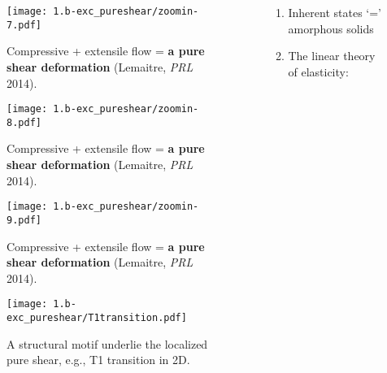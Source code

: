 \begin{frame}[c]
\begin{columns}[T]
\begin{column}[T]{0.4\textwidth}
\begin{figure}[t]
\begin{overprint}
\centering\texttt{[image: 1.b-exc\_pureshear/zoomin-7.pdf]}\caption{Compressive + extensile flow = \textbf{a pure shear deformation} {\footnotesize (Lemaitre, \textit{PRL} 2014).}}

\centering\texttt{[image: 1.b-exc\_pureshear/zoomin-8.pdf]}\caption{Compressive + extensile flow = \textbf{a pure shear deformation} {\footnotesize (Lemaitre, \textit{PRL} 2014).}}

\centering\texttt{[image: 1.b-exc\_pureshear/zoomin-9.pdf]}\caption{Compressive + extensile flow = \textbf{a pure shear deformation} (Lemaitre, \textit{PRL} 2014).}

\centering\texttt{[image: 1.b-exc\_pureshear/T1transition.pdf]}\caption{A structural motif underlie the localized pure shear, e.g., T1 transition in 2D.}



    
\end{overprint}
\end{figure}

\end{column}

\begin{column}[T]{0.6\textwidth}

\begin{enumerate}
\item<2-> Inherent states `=' amorphous solids %

\item<13-> The linear theory of elasticity: %


\end{enumerate}
\end{column}
\end{columns}
\end{frame}
